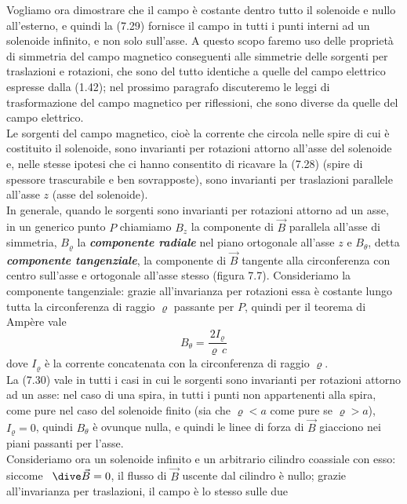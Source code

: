 Vogliamo ora dimostrare che il campo \`e costante dentro tutto il solenoide e
nullo all'esterno, e quindi la (7.29) fornisce il campo in tutti i punti interni
ad un solenoide infinito, e non solo sull'asse. A questo scopo faremo uso delle
propriet\`a di simmetria del campo magnetico conseguenti alle simmetrie delle
sorgenti per traslazioni e rotazioni, che sono del tutto identiche a quelle del
campo elettrico espresse dalla (1.42); nel prossimo paragrafo discuteremo le
leggi di trasformazione del campo magnetico per riflessioni, che sono diverse da
quelle del campo elettrico.\\
Le sorgenti del campo magnetico, cio\`e la corrente che circola nelle spire di
cui \`e costituito il solenoide, sono invarianti per rotazioni attorno all'asse
del solenoide e, nelle stesse ipotesi che ci hanno consentito di ricavare la
(7.28) (spire di spessore trascurabile e ben sovrapposte), sono invarianti per
traslazioni parallele all'asse $z$ (asse del solenoide).\\
In generale, quando le sorgenti sono invarianti per rotazioni attorno ad un
asse, in un generico punto $P$ chiamiamo $B_z$ la componente di $\vec B$
parallela all'asse di simmetria, $B_\varrho$ la \textbf{\textit{componente
radiale}} nel piano ortogonale all'asse $z$ e $B_\theta$, detta
\textbf{\textit{componente tangenziale}}, la componente di $\vec B$ tangente
alla circonferenza con centro sull'asse e ortogonale all'asse stesso (figura
7.7).
Consideriamo la componente tangenziale: grazie all'invarianza per rotazioni essa
\`e costante lungo tutta la circonferenza di raggio $\varrho$ passante per $P$,
quindi per il teorema di Amp\`ere vale
\begin{equation}
  B_\theta=\frac{2I_\varrho}{\varrho\,c}
  \tag{7.30}
\end{equation}
dove $I_\varrho$ \`e la corrente concatenata con la circonferenza di raggio
$\varrho$.\\
La (7.30) vale in tutti i casi in cui le sorgenti sono invarianti per rotazioni
attorno ad un asse: nel caso di una spira, in tutti i punti non appartenenti
alla spira, come pure nel caso del solenoide finito (sia che $\varrho<a$ come
pure se $\varrho>a$), \ $I_\varrho=0$, quindi $B_\theta$ \`e ovunque nulla, e
quindi le linee di forza di $\vec B$ giacciono nei piani passanti per l'asse.\\
Consideriamo ora un solenoide infinito e un arbitrario cilindro coassiale con
esso: siccome \ $\dive\vec B=0$, il flusso di $\vec B$ uscente dal cilindro \`e
nullo; grazie all'invarianza per traslazioni, il campo \`e lo stesso sulle due

